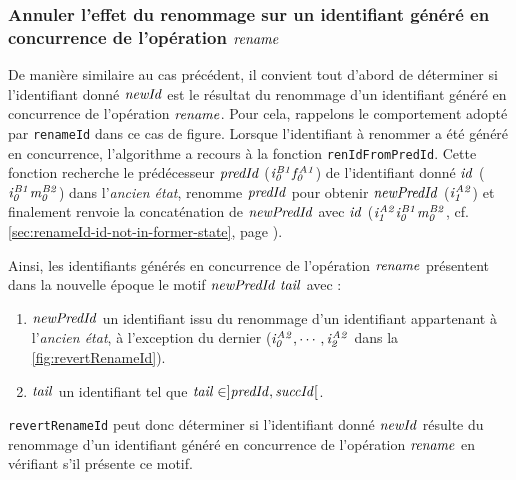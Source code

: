 \subsubsection{Annuler l'effet du renommage sur un identifiant généré en concurrence de l'opération $\mathit{rename}$}

\label{sec:reverting-rename-ops-id-inserted-concurrently}

De manière similaire au cas précédent, il convient tout d'abord de déterminer si l'identifiant donné $\mathit{newId}$ est le résultat du renommage d'un identifiant généré en concurrence de l'opération $\mathit{rename}$.
Pour cela, rappelons le comportement adopté par \texttt{renameId} dans ce cas de figure.
Lorsque l'identifiant à renommer a été généré en concurrence, l'algorithme a recours à la fonction \texttt{renIdFromPredId}.
Cette fonction recherche le prédécesseur $\mathit{predId}$ (\eg $\mathit{i}^{\mathit{B1}}_{\mathit{0}}\mathit{f}^{\mathit{A1}}_{\mathit{0}}$) de l'identifiant donné $\mathit{id}$ (\eg $\mathit{i}^{\mathit{B1}}_{\mathit{0}}\mathit{m}^{\mathit{B2}}_{\mathit{0}}$) dans l'\emph{ancien état}, renomme $\mathit{predId}$ pour obtenir $\mathit{newPredId}$ ($\mathit{i}^{\mathit{A2}}_{\mathit{1}}$) et finalement renvoie la concaténation de $\mathit{newPredId}$ avec $\mathit{id}$ ($\mathit{i}^{\mathit{A2}}_{\mathit{1}}\mathit{i}^{\mathit{B1}}_{\mathit{0}}\mathit{m}^{\mathit{B2}}_{\mathit{0}}$, cf. \autoref{sec:renameId-id-not-in-former-state}, page \pageref{sec:renameId-id-not-in-former-state}).

Ainsi, les identifiants générés en concurrence de l'opération $\mathit{rename}$ présentent dans la nouvelle époque le motif $\mathit{newPredId}~\mathit{tail}$ avec :
\begin{enumerate}
    \item $\mathit{newPredId}$ un identifiant issu du renommage d'un identifiant appartenant à l'\emph{ancien état}, à l'exception du dernier (\eg $\mathit{i}^{\mathit{A2}}_{\mathit{0}},\cdots,\mathit{i}^{\mathit{A2}}_{\mathit{2}}$ dans la \autoref{fig:revertRenameId}).
    \item $\mathit{tail}$ un identifiant tel que $\mathit{tail} \in ]\mathit{predId}, \mathit{succId}[$.
\end{enumerate}
\texttt{revertRenameId} peut donc déterminer si l'identifiant donné $\mathit{newId}$ résulte du renommage d'un identifiant généré en concurrence de l'opération $\mathit{rename}$ en vérifiant s'il présente ce motif.

